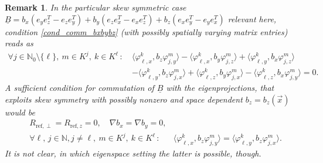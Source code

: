 \documentclass[12pt]{article}
\newtheorem{remark}[theorem]{Remark}
\newcommand\vecr{\vec{x}}
\newcommand\ulB{\underline{B}}
\begin{document}
\begin{remark}\label{rem:comm_BT}
In the particular skew symmetric case 
$\ulB=b_x(e_ye_z^T-e_ze_y^T)+b_y(e_ze_x^T-e_xe_z^T)+b_z(e_xe_y^T-e_ye_x^T)$
relevant here, condition \eqref{cond_comm_bxbybz} (with possibly spatially varying matrix entries) reads as 
\begin{equation*}%
\begin{aligned}
\forall j\in \mathbb{N}_0\setminus\{\ell\}, \ m\in K^j, \ k\in K^\ell \,:\
& \langle \varphi_{\ell,x}^k,b_z \varphi_{j,y}^m \rangle
-\langle \varphi_{\ell,x}^k,b_y \varphi_{j,z}^m \rangle
+\langle \varphi_{\ell,y}^k,b_x \varphi_{j,z}^m \rangle\\
&-\langle \varphi_{\ell,y}^k,b_z \varphi_{j,x}^m \rangle
+\langle \varphi_{\ell,z}^k,b_y \varphi_{j,x}^m \rangle
-\langle \varphi_{\ell,z}^k,b_x \varphi_{j,y}^m \rangle
=0.
\end{aligned}
\end{equation*}
A sufficient condition for commutation of $\ulB$ with the eigenprojections, that exploits skew symmetry with possibly nonzero and space dependent $b_z=b_z(\vecr)$ would be
\[
\begin{aligned}
&R_{\text{ref},\perp}=R_{\text{ref},z}= 0, \quad 
\nabla b_x=\nabla b_y=0, \\ 
&\forall \ell,\,j\in \mathbb{N}, j\not=\ell, \ m\in K^j, \ k\in K^\ell \,:\
& \langle \varphi_{\ell,x}^k, b_z \varphi_{j,y}^m \rangle
=\langle \varphi_{\ell,y}^k, b_z \varphi_{j,x}^m \rangle.
\end{aligned}
\]
It is not clear, in which eigenspace setting the latter is possible, though. 
\end{remark}

\medskip
\end{document}
